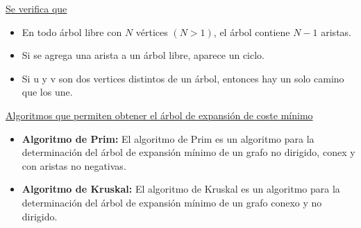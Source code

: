 \documentclass[../main.tex]{subfiles}
\begin{document}
            \underline{Se verifica que}
            \begin{itemize}
                \item En todo árbol libre con $N$ vértices $(N>1)$, el árbol contiene $N-1$ aristas.
                \item Si se agrega una arista a un árbol libre, aparece un ciclo.
                \item Si u y v son dos vertices distintos de un árbol, entonces hay un solo camino que los une.
            \end{itemize}

            \underline{Algoritmos que permiten obtener el árbol de expansión de coste mínimo}
            \begin{itemize}
                \item \textbf{Algoritmo de Prim:} El algoritmo de Prim es un algoritmo para la determinación del árbol de expansión mínimo de un grafo no dirigido, conex y con aristas no negativas.
                \item \textbf{Algoritmo de Kruskal:} El algoritmo de Kruskal es un algoritmo para la determinación del árbol de expansión mínimo de un grafo conexo y no dirigido.
            \end{itemize}
\end{document}
